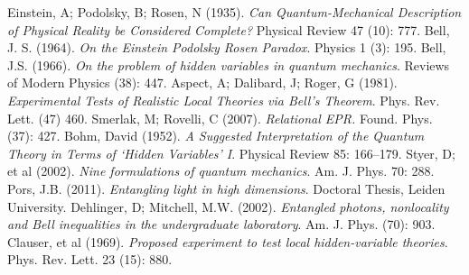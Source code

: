 \documentclass{article}
\begin{document}
\begin{thebibliography}{9}
    Einstein, A; Podolsky, B; Rosen, N (1935). 
    \emph{Can Quantum-Mechanical Description of Physical Reality be Considered Complete?}
    Physical Review 47 (10): 777.
    Bell, J. S. (1964). 
    \emph{On the Einstein Podolsky Rosen Paradox}. 
    Physics 1 (3): 195.
    Bell, J.S. (1966). 
    \emph{On the problem of hidden variables in quantum mechanics}. 
    Reviews of Modern Physics (38): 447.
    Aspect, A; Dalibard, J; Roger, G (1981).
    \emph{Experimental Tests of Realistic Local Theories via Bell's Theorem}.
    Phys. Rev. Lett. (47) 460.
    Smerlak, M; Rovelli, C (2007).
    \emph{Relational EPR.}
    Found. Phys. (37): 427.
    Bohm, David (1952). \emph{A Suggested Interpretation of the Quantum Theory in Terms of `Hidden Variables' I}. Physical Review 85: 166–179.
    Styer, D; et al (2002).
    \emph{Nine formulations of quantum mechanics}.
    Am. J. Phys. 70: 288. 
    Pors, J.B. (2011).
    \emph{Entangling light in high dimensions}. 
    Doctoral Thesis, Leiden University.
    Dehlinger, D; Mitchell, M.W. (2002).
    \emph{Entangled photons, nonlocality and Bell inequalities in the undergraduate laboratory}.
    Am. J. Phys. (70): 903.
    Clauser, et al (1969). 
    \emph{Proposed experiment to test local hidden-variable theories}.
    Phys. Rev. Lett. 23 (15): 880.

\end{thebibliography}
\end{document}
